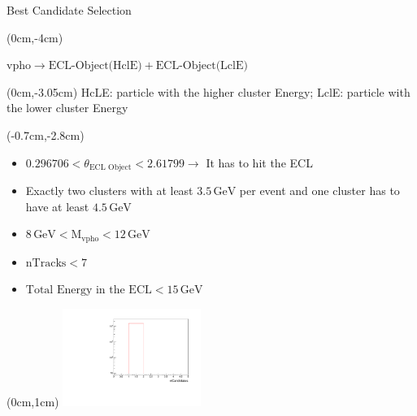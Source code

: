\documentclass[8pt]{beamer}
\begin{document}
	
\begin{frame}{Best Candidate Selection}
	
	\begin{textblock*}{\textwidth}(0cm,-4cm)
		\begin{center}	
			$\textrm{vpho} \rightarrow \textrm{ECL-Object(HclE)} + \textrm{ECL-Object(LclE)}$	
		\end{center}

	\end{textblock*}
	
	\begin{textblock*}{\textwidth}(0cm,-3.05cm)
		\scriptsize{		HcLE: particle with the higher cluster Energy; 	
		LclE: particle with the lower cluster Energy
}		
	\end{textblock*}

	
	
	
	\begin{textblock*}{1.2\textwidth}(-0.7cm,-2.8cm)
		

	
	
	\begin{itemize}
		
		\item $0.296706 < \theta_{\textrm{ECL Object}} < 2.61799 \rightarrow$ It has to hit the ECL
		\item Exactly two clusters with at least $3.5\,\textrm{GeV}$ per event and one cluster has to have at least $4.5\,\textrm{GeV}$
		\item $8\,\textrm{GeV} < \textrm{M}_{\textrm{vpho}} < 12\,\textrm{GeV}$
		\item $\textrm{nTracks} < 7$ 
		\item $\textrm{Total Energy in the ECL} < 15\,\textrm{GeV}$
						
		\end{itemize}

	\end{textblock*}


\begin{textblock*}{0.5\textwidth}(0cm,1cm)
	\includegraphics[width=4.5cm]{Plots/nCandMC}
\end{textblock*}



\end{frame}
\end{document}
